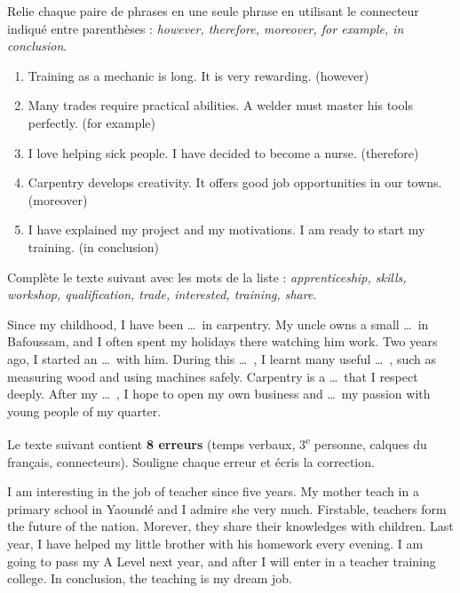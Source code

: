 \documentclass[11pt]{article}
\begin{document}
\begin{exercice}
Relie chaque paire de phrases en une seule phrase en utilisant le connecteur indiqué entre parenthèses : \emph{however, therefore, moreover, for example, in conclusion}.

\begin{enumerate}
\item Training as a mechanic is long. It is very rewarding. (however)
\item Many trades require practical abilities. A welder must master his tools perfectly. (for example)
\item I love helping sick people. I have decided to become a nurse. (therefore)
\item Carpentry develops creativity. It offers good job opportunities in our towns. (moreover)
\item I have explained my project and my motivations. I am ready to start my training. (in conclusion)
\end{enumerate}
\end{exercice}

\begin{exercice}
Complète le texte suivant avec les mots de la liste : \emph{apprenticeship, skills, workshop, qualification, trade, interested, training, share}.

\begin{textebox}
Since my childhood, I have been \ldots\ in carpentry. My uncle owns a small \ldots\ in Bafoussam, and I often spent my holidays there watching him work. Two years ago, I started an \ldots\ with him. During this \ldots\ , I learnt many useful \ldots\ , such as measuring wood and using machines safely. Carpentry is a \ldots\ that I respect deeply. After my \ldots\ , I hope to open my own business and \ldots\ my passion with young people of my quarter.
\end{textebox}
\end{exercice}

\begin{exercice}
Le texte suivant contient \textbf{8 erreurs} (temps verbaux, 3\textsuperscript{e} personne, calques du français, connecteurs). Souligne chaque erreur et écris la correction.

\begin{textebox}
I am interesting in the job of teacher since five years. My mother teach in a primary school in Yaoundé and I admire she very much. Firstable, teachers form the future of the nation. Morever, they share their knowledges with children. Last year, I have helped my little brother with his homework every evening. I am going to pass my A Level next year, and after I will enter in a teacher training college. In conclusion, the teaching is my dream job.
\end{textebox}
\end{exercice}
\end{document}
